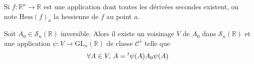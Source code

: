 





  \begin{notation}
    Si $f : \mathbb{R}^n \rightarrow \mathbb{R}$ est une application dont toutes les dérivées secondes existent, on note $\mathrm{Hess}(f)_a$ la hessienne de $f$ au point $a$.
  \end{notation}


  \begin{lemma}
    \label{lemme-de-morse-1}
    Soit $A_0 \in \mathcal{S}_n(\mathbb{R})$ inversible. Alors il existe un voisinage $V$ de $A_0$ dans $\mathcal{S}_n(\mathbb{R})$ et une application $\psi : V \rightarrow \mathrm{GL}_n(\mathbb{R})$ de classe $\mathcal{C}^1$ telle que
    \[ \forall A \in V, \, A = \mathstrut ^t \psi(A) A_0 \psi(A) \]
  \end{lemma}

